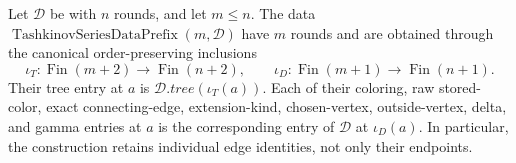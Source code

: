 \begin{definition}
Let \(\mathcal D\) be  with \(n\) rounds, and
let \(m\leq n\).  The data
\(\operatorname{TashkinovSeriesDataPrefix}(m,\mathcal D)\) have \(m\)
rounds and are obtained through the canonical order-preserving inclusions
\[
 \iota_T:\operatorname{Fin}(m+2)\longrightarrow\operatorname{Fin}(n+2),
 \qquad
 \iota_D:\operatorname{Fin}(m+1)\longrightarrow\operatorname{Fin}(n+1).
\]
Their tree entry at \(a\) is \(\mathcal D.\mathit{tree}(\iota_T(a))\).
Each of their coloring, raw stored-color, exact connecting-edge, extension-kind,
chosen-vertex, outside-vertex, delta, and gamma entries at \(a\) is the
corresponding entry of \(\mathcal D\) at \(\iota_D(a)\).  In particular, the
construction retains individual edge identities, not only their endpoints.
\end{definition}
